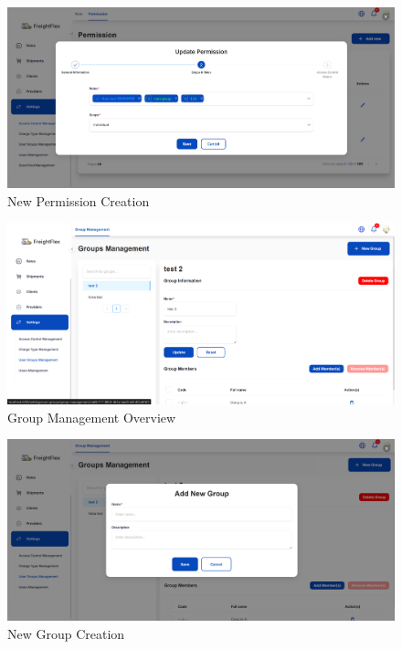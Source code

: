 \begin{figure}[H]
    \centering
    \includegraphics[width=15cm]{graphics/UI/new-permission.png}
    \caption{New Permission Creation}
    \label{fig:new-permission}
\end{figure}

\begin{figure}[H]
    \centering
    \includegraphics[width=15cm]{graphics/UI/group-management.png}
    \caption{Group Management Overview}
    \label{fig:group-management}
\end{figure}

\begin{figure}[H]
    \centering
    \includegraphics[width=15cm]{graphics/UI/new-group.png}
    \caption{New Group Creation}
    \label{fig:new-group}
\end{figure}

